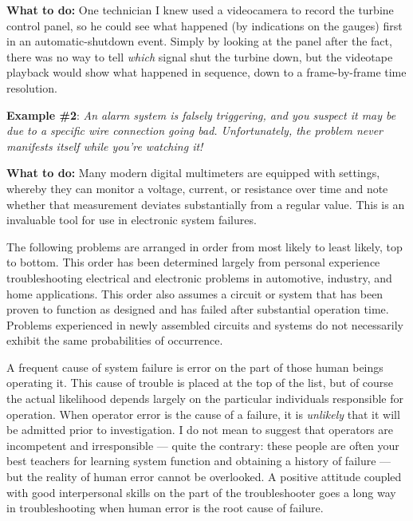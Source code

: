 {\bf What to do:} One technician I knew used a videocamera to record the
turbine control panel, so he could see what happened (by indications on
the gauges) first in an automatic-shutdown event. Simply by looking at
the panel after the fact, there was no way to tell {\em which} signal
shut the turbine down, but the videotape playback would show what
happened in sequence, down to a frame-by-frame time resolution.

{\bf Example \#2}: {\em An alarm system is falsely triggering, and you
suspect it may be due to a specific wire connection going bad.
Unfortunately, the problem never manifests itself while you're watching
it!}

{\bf What to do:} Many modern digital multimeters are equipped with
 settings, whereby they can monitor a voltage,
current, or resistance over time and note whether that measurement
deviates substantially from a regular value. This is an invaluable tool
for use in  electronic system failures.

\stopsubsection

\stopsection

\startsection[title={Likely Failures in Proven
Systems},reference={sec:xtocid157909713}]

The following problems are arranged in order from most likely to least
likely, top to bottom. This order has been determined largely from
personal experience troubleshooting electrical and electronic problems
in automotive, industry, and home applications. This order also assumes
a circuit or system that has been proven to function as designed and has
failed after substantial operation time. Problems experienced in newly
assembled circuits and systems do not necessarily exhibit the same
probabilities of occurrence.

\startsubsection[title={Operator Error},reference={sec:xtocid157909714}]

A frequent cause of system failure is error on the part of those human
beings operating it. This cause of trouble is placed at the top of the
list, but of course the actual likelihood depends largely on the
particular individuals responsible for operation. When operator error is
the cause of a failure, it is {\em unlikely} that it will be admitted
prior to investigation. I do not mean to suggest that operators are
incompetent and irresponsible --- quite the contrary: these people are
often your best teachers for learning system function and obtaining a
history of failure --- but the reality of human error cannot be
overlooked. A positive attitude coupled with good interpersonal skills
on the part of the troubleshooter goes a long way in troubleshooting
when human error is the root cause of failure.

